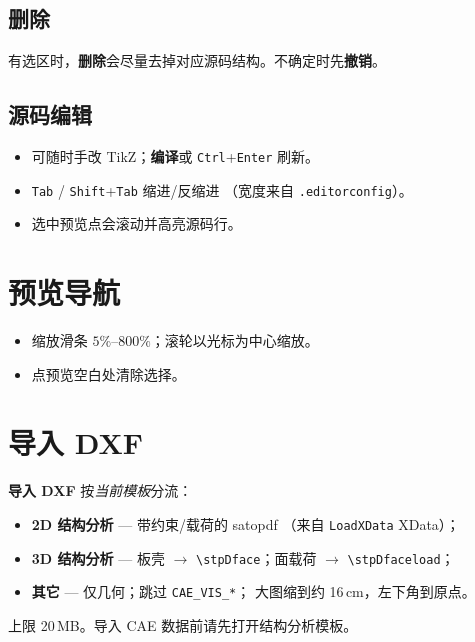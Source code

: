 \documentclass[a4paper]{ltxdoc}
\newcommand{\ui}[1]{\textbf{#1}}
\newcommand{\key}[1]{\texttt{#1}}
\begin{document}
\subsection{删除}
有选区时，\ui{删除}会尽量去掉对应源码结构。不确定时先\ui{撤销}。

\subsection{源码编辑}
\begin{itemize}[nosep]
  \item 可随时手改 TikZ；\ui{编译}或 \key{Ctrl}+\key{Enter} 刷新。
  \item \key{Tab} / \key{Shift}+\key{Tab} 缩进/反缩进
        （宽度来自 \texttt{.editorconfig}）。
  \item 选中预览点会滚动并高亮源码行。
\end{itemize}

\section{预览导航}

\begin{itemize}[nosep]
  \item 缩放滑条 $5\%$--$800\%$；滚轮以光标为中心缩放。
  \item 点预览空白处清除选择。
\end{itemize}

\section{导入 DXF}

\ui{导入 DXF} 按\emph{当前模板}分流：

\begin{itemize}[nosep]
  \item \textbf{2D 结构分析} --- 带约束/载荷的 \textsf{satopdf}
        （来自 \texttt{LoadXData} XData）；
  \item \textbf{3D 结构分析} --- 板壳 $\rightarrow$
        \texttt{\textbackslash stpDface}；面载荷 $\rightarrow$
        \texttt{\textbackslash stpDfaceload}；
  \item \textbf{其它} --- 仅几何；跳过 \texttt{CAE\_VIS\_*}；
        大图缩到约 16\,cm，左下角到原点。
\end{itemize}
上限 20\,MB。导入 CAE 数据前请先打开结构分析模板。
\end{document}
